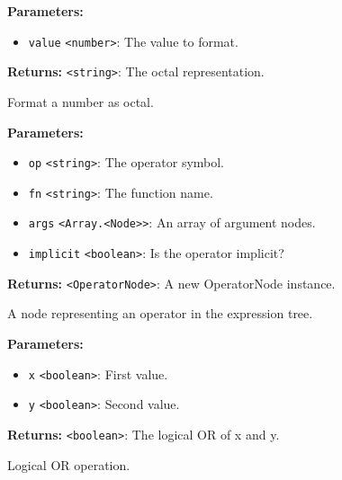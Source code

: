 \documentclass[12pt,a4paper]{article}
\begin{document}
\noindent \textbf{Parameters:}
\begin{itemize}
  \item \texttt{value} \texttt{<number>}: The value to format.
\end{itemize}

\noindent \textbf{Returns:} \texttt{<string>}: The octal representation.

\noindent Format a number as octal.

\vspace{5mm}
\noindent {}


\noindent \textbf{Parameters:}
\begin{itemize}
  \item \texttt{op} \texttt{<string>}: The operator symbol.
  \item \texttt{fn} \texttt{<string>}: The function name.
  \item \texttt{args} \texttt{<Array.<Node>>}: An array of argument nodes.
  \item \texttt{implicit} \texttt{<boolean>}: Is the operator implicit?
\end{itemize}

\noindent \textbf{Returns:} \texttt{<OperatorNode>}: A new OperatorNode instance.

\noindent A node representing an operator in the expression tree.

\vspace{5mm}
\noindent {}


\noindent \textbf{Parameters:}
\begin{itemize}
  \item \texttt{x} \texttt{<boolean>}: First value.
  \item \texttt{y} \texttt{<boolean>}: Second value.
\end{itemize}

\noindent \textbf{Returns:} \texttt{<boolean>}: The logical OR of x and y.

\noindent Logical OR operation.

\vspace{5mm}
\noindent {}
\end{document}

